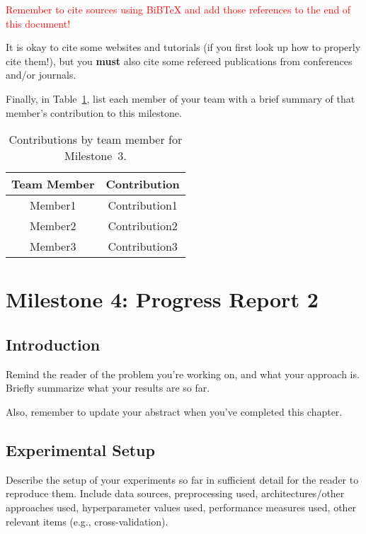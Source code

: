 \documentclass{report}
\begin{document}
\textcolor{red}{Remember to cite sources using BiBTeX and add those references to the end of this document!}

It is okay to cite some websites and tutorials (if you first look up how to properly cite them!), but you {\bf must} also cite some refereed publications from conferences and/or journals.

Finally, in Table~\ref{tab:contribution3}, list each member of your team with a brief summary of that member's contribution to this milestone.

\begin{table}[]
    \caption{Contributions by team member for Milestone~3.}
    \centering
    \begin{tabular}{|c|c|} \hline
    {\bf Team Member}     &  {\bf Contribution}  \\ \hline
    Member1     &  Contribution1 \\
    Member2     &  Contribution2 \\
    Member3     &  Contribution3 \\ \hline
    \end{tabular}
    \label{tab:contribution3}
\end{table}


\chapter{Milestone 4: Progress Report 2}


\section{Introduction}
\label{sec:M4-intro}

Remind the reader of the problem you're working on, and what your approach is.  Briefly summarize what your results are so far.

Also, remember to update your abstract when you've completed this chapter.

\section{Experimental Setup}
\label{sec:M3-setup}

Describe the setup of your experiments so far in sufficient detail for the reader to reproduce them.  Include data sources, preprocessing used, architectures/other approaches used, hyperparameter values used, performance measures used, other relevant items (e.g., cross-validation).
\end{document}
